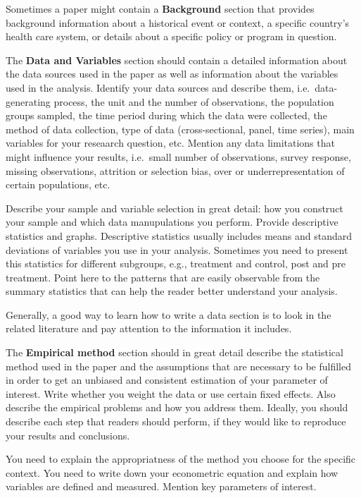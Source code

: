 \documentclass[
]{book}
\begin{document}
Sometimes a paper might contain a \textbf{Background} section that
provides background information about a historical event or context, a
specific country's health care system, or details about a specific
policy or program in question.

The \textbf{Data and Variables} section should contain a detailed
information about the data sources used in the paper as well as
information about the variables used in the analysis. Identify your data
sources and describe them, i.e.~data-generating process, the unit and
the number of observations, the population groups sampled, the time
period during which the data were collected, the method of data
collection, type of data (cross-sectional, panel, time series), main
variables for your reseaarch question, etc. Mention any data limitations
that might influence your results, i.e.~small number of observations,
survey response, missing observations, attrition or selection bias, over
or underrepresentation of certain populations, etc.

Describe your sample and variable selection in great detail: how you
construct your sample and which data manupulations you perform. Provide
descriptive statistics and graphs. Descriptive statistics usually
includes means and standard deviations of variables you use in your
analysis. Sometimes you need to present this statistics for different
subgroups, e.g., treatment and control, post and pre treatment. Point
here to the patterns that are easily observable from the summary
statistics that can help the reader better understand your analysis.

Generally, a good way to learn how to write a data section is to look in
the related literature and pay attention to the information it includes.

The \textbf{Empirical method} section should in great detail describe
the statistical method used in the paper and the assumptions that are
necessary to be fulfilled in order to get an unbiased and consistent
estimation of your parameter of interest. Write whether you weight the
data or use certain fixed effects. Also describe the empirical problems
and how you address them. Ideally, you should describe each step that
readers should perform, if they would like to reproduce your results and
conclusions.

You need to explain the appropriatness of the method you choose for the
specific context. You need to write down your econometric equation and
explain how variables are defined and measured. Mention key parameters
of interest.
\end{document}
